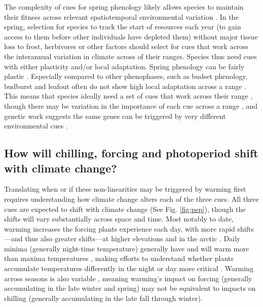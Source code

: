 \documentclass[11pt,letter]{article}
\begin{document}
The complexity of cues for spring phenology likely allows species to maintain their fitness across relevant spatiotemporal environmental variation \citep{Chuine2000,chuinearees}. In the spring, selection for species to track the start of resources each year (to gain access to them before other individuals have depleted them) without major tissue loss to frost, herbivores or other factors \citep{Wainwright:2012tw,cat2019} should select for cues that work across the interannual variation in climate across of their ranges. Species thus need cues with either plasticity and/or local adaptation. Spring phenology can be fairly plastic \citep{vitasselev,kramer2017}. Especially compared to other phenophases, such as budset phenology, budburst and leafout often do not show high local adaptation across a range \citep{mimura2010}. This means that species ideally need a set of cues that work across their range \citep{liepe2016}, though there may be variation in the importance of each cue across a range \citep[e.g., chilling can be higher in coastal versus continental, see][]{campbell1979}, and genetic work suggests the same genes can be triggered by very different environmental cues \citep[e.g.,][]{simpson2002arab,Stinchcombe:2004ec}. \\


\subsection{How will chilling, forcing and photoperiod shift with climate change?}
Translating when or if these non-linearities may be triggered by warming first requires understanding how climate change alters each of the three cues. All three cues are expected to shift with climate change (See Fig. \ref{fig:pep}), though the shifts will vary substantially across space and time. Most notably to date, warming increases the forcing plants experience each day, with more rapid shifts---and thus also greater shifts---at higher elevations and in the arctic \citep{IPCC:2014sm}. Daily minima (generally night-time temperature) generally have and will warm more than maxima temperatures \citep[though this effect varies spatially][]{Alexander:2006qy}, making efforts to understand whether plants accumulate temperatures differently in the night or day more critical \citep{prasad2008,shen2018}. Warming across seasons is also variable \citep{Alexander:2006qy}, meaning warming's impact on forcing (generally accumulating in the late winter and spring) may not be equivalent to impacts on chilling (generally accumulating in the late fall through winter). \\ 
\end{document}

